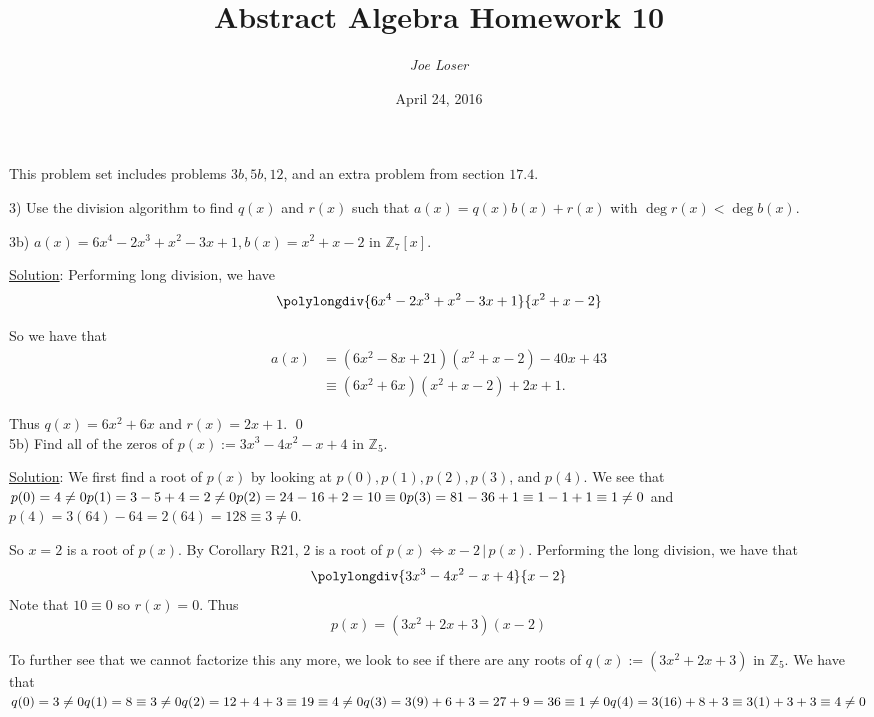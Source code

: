 \documentclass{article}
\title{Abstract Algebra Homework 10}
\author{\textit{Joe Loser}}
\date{April 24, 2016}
\begin{document}
\maketitle

This problem set includes problems $3b, 5b, 12$, and an extra problem from section $17.4$.

3) Use the division algorithm to find $q(x)$ and $r(x)$ such that $a(x) = q(x)b(x) + r(x)$ with $\deg r(x) < \deg b(x)$.

3b) $a(x) = 6x^4-2x^3+x^2-3x+1, b(x) = x^2 + x - 2$ in $\mathbb{Z}_7[x]$.

\underline{Solution}: Performing long division, we have  $$\polylongdiv{6x^4-2x^3+x^2-3x+1}{x^2+x-2}$$

So we have that
\begin{align*}
	a(x) &= (6x^2-8x+21)(x^2+x-2) - 40x + 43 \\
	&\equiv (6x^2+6x)(x^2+x-2) + 2x + 1.
\end{align*}

Thus $q(x) = 6x^2 + 6x$ and $r(x) = 2x + 1$. \qed \\

5b) Find all of the zeros of $p(x) := 3x^3-4x^2-x+4$ in $\mathbb{Z}_5$.

\underline{Solution}: We first find a root of $p(x)$ by looking at $p(0), p(1), p(2), p(3)$, and $p(4)$. We see that
$\\p(0) = 4 \neq 0 \\
p(1) = 3 - 5 + 4 = 2 \neq 0 \\
p(2) = 24 - 16 + 2 = 10 \equiv 0 \\
p(3) = 81-36+1 \equiv 1-1+1 \equiv 1 \neq 0$ and \\
$p(4) = 3(64)-64 = 2(64) = 128 \equiv 3 \neq 0$. 

So $x = 2$ is a root of $p(x)$. By Corollary R21, $2$ is a root of $p(x) \iff x-2 \, \vert \, p(x)$. Performing the long division, we have that
$$ \polylongdiv{3x^3-4x^2-x+4}{x-2} $$
Note that $10 \equiv 0$ so $r(x) = 0$. Thus 
\begin{equation}
	p(x) = (3x^2+2x+3)(x-2)
\end{equation}

To further see that we cannot factorize this any more, we look to see if there are any roots of $q(x) := (3x^2+2x+3)$ in $\mathbb{Z}_5$. We have that 
$\\q(0) = 3 \neq 0 \\
q(1) = 8 \equiv 3 \neq 0 \\
q(2) = 12 + 4 + 3 \equiv 19 \equiv 4 \neq 0 \\
q(3) = 3(9) + 6 + 3 = 27 + 9 = 36 \equiv 1 \neq 0 \\
q(4) = 3(16) + 8 + 3 \equiv 3(1) + 3 + 3 \equiv 4 \neq 0$ \\
\end{document}

